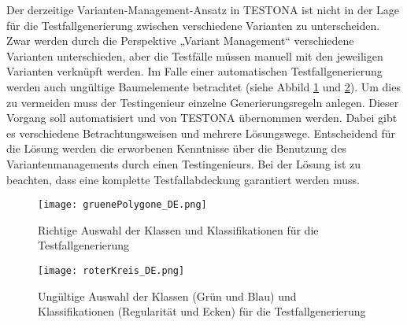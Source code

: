 Der derzeitige Varianten-Management-Ansatz in TESTONA ist nicht in der Lage für die Testfallgenerierung zwischen verschiedene Varianten zu unterscheiden. Zwar werden durch die Perspektive „Variant Management“ verschiedene Varianten unterschieden, aber die Testfälle müssen manuell mit den jeweiligen Varianten verknüpft werden. Im Falle einer automatischen Testfallgenerierung werden auch ungültige Baumelemente betrachtet (siehe Abbild \ref{ttn.gruen} und \ref{ttn.rot}). Um dies zu vermeiden muss der Testingenieur einzelne Generierungsregeln anlegen. Dieser Vorgang soll automatisiert und von TESTONA übernommen werden. Dabei gibt es verschiedene Betrachtungsweisen und mehrere Lösungswege. Entscheidend für die Lösung werden die erworbenen Kenntnisse über die Benutzung des Variantenmanagements durch einen Testingenieurs. Bei der Lösung ist zu beachten, dass eine komplette Testfallabdeckung garantiert werden muss.\\


\begin{figure}[h]
  \begin{center}
    \texttt{[image: gruenePolygone\_DE.png]}
  		  \caption{Richtige Auswahl der Klassen und Klassifikationen für die Testfallgenerierung}
     \label{ttn.gruen}
  \end{center}
\end{figure}


\begin{figure}[h]
  \begin{center}
    \texttt{[image: roterKreis\_DE.png]}
  		  \caption{Ungültige Auswahl der Klassen (Grün und Blau) und Klassifikationen (Regularität und Ecken) für die Testfallgenerierung}
     \label{ttn.rot}
  \end{center}
\end{figure}


